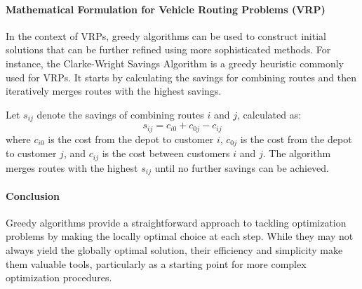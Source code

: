 \documentclass[
]{article}
\begin{document}
\paragraph{Mathematical Formulation for Vehicle Routing Problems (VRP)}

In the context of VRPs, greedy algorithms can be used to construct initial solutions that can be further refined using more sophisticated methods. For instance, the Clarke-Wright Savings Algorithm is a greedy heuristic commonly used for VRPs. It starts by calculating the savings for combining routes and then iteratively merges routes with the highest savings.

Let \(s_{ij}\) denote the savings of combining routes \(i\) and \(j\), calculated as:
\[
s_{ij} = c_{i0} + c_{0j} - c_{ij}
\]
where \(c_{i0}\) is the cost from the depot to customer \(i\), \(c_{0j}\) is the cost from the depot to customer \(j\), and \(c_{ij}\) is the cost between customers \(i\) and \(j\). The algorithm merges routes with the highest \(s_{ij}\) until no further savings can be achieved.

\paragraph{Conclusion}

Greedy algorithms provide a straightforward approach to tackling optimization problems by making the locally optimal choice at each step. While they may not always yield the globally optimal solution, their efficiency and simplicity make them valuable tools, particularly as a starting point for more complex optimization procedures.



\end{document}
